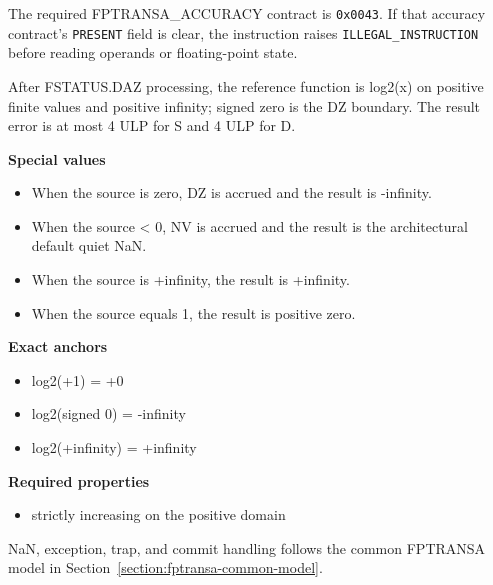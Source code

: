 The required FPTRANSA\_ACCURACY contract is \texttt{0x0043}. If that accuracy contract's \texttt{PRESENT} field is clear, the instruction raises \texttt{ILLEGAL\_INSTRUCTION} before reading operands or floating-point state.

After FSTATUS.DAZ processing, the reference function is log2(x) on positive finite values and positive infinity; signed zero is the DZ boundary. The result error is at most 4 ULP for S and 4 ULP for D.

\textbf{Special values}\par
\begin{itemize}
\item When the source is zero, DZ is accrued and the result is -infinity.
\item When the source \textless{} 0, NV is accrued and the result is the architectural default quiet NaN.
\item When the source is +infinity, the result is +infinity.
\item When the source equals 1, the result is positive zero.
\end{itemize}

\textbf{Exact anchors}\par
\begin{itemize}
\item log2(+1) = +0
\item log2(signed 0) = -infinity
\item log2(+infinity) = +infinity
\end{itemize}

\textbf{Required properties}\par
\begin{itemize}
\item strictly increasing on the positive domain
\end{itemize}

NaN, exception, trap, and commit handling follows the common FPTRANSA model in Section~\ref{section:fptransa-common-model}.
